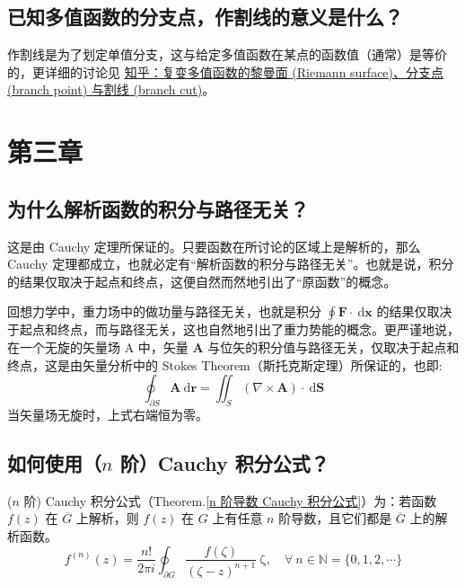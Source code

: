 \documentclass[UTF8]{report}
\def\N{\mathbb{N}}
\theoremstyle{MyLineTheoremStyle} %
\theoremstyle{MyBlockTheoremStyle} %
\theoremstyle{MySubsubsectionStyle} %
\begin{document}
\subsection{已知多值函数的分支点，作割线的意义是什么？}
作割线是为了划定单值分支，这与给定多值函数在某点的函数值（通常）是等价的，更详细的讨论见 \href{https://zhuanlan.zhihu.com/p/422338793}{知乎：复变多值函数的黎曼面 (Riemann surface)、分支点 (branch point) 与割线 (branch cut)}。

\section{第三章}

\subsection{为什么解析函数的积分与路径无关？}

这是由 Cauchy 定理所保证的。只要函数在所讨论的区域上是解析的，那么 Cauchy 定理都成立，也就必定有“解析函数的积分与路径无关”。也就是说，积分的结果仅取决于起点和终点，这便自然而然地引出了“原函数”的概念。

回想力学中，重力场中的做功量与路径无关，也就是积分 $\oint \boldsymbol{F}\cdot \ \mathrm{d}\boldsymbol{x}$ 的结果仅取决于起点和终点，而与路径无关，这也自然地引出了重力势能的概念。更严谨地说，在一个无旋的矢量场 A 中，矢量 $\boldsymbol{A}$ 与位矢的积分值与路径无关，仅取决于起点和终点，这是由矢量分析中的 Stokes Theorem（斯托克斯定理）所保证的，也即: 
\begin{equation}
\oint_{\partial S} \boldsymbol{A} \ \mathrm{d}\boldsymbol{r} = \iint_S (\nabla \times \boldsymbol{A}) \cdot \ \mathrm{d}\boldsymbol{S}
\end{equation}
当矢量场无旋时，上式右端恒为零。

\subsection{如何使用（$n$ 阶）Cauchy 积分公式？}

($n$ 阶) Cauchy 积分公式（Theorem.\ref{n 阶导数 Cauchy 积分公式}）为：若函数 $f(z)$ 在 $\overline{G}$ 上解析，则 $f(z)$ 在 $G$ 上有任意 $n$ 阶导数，且它们都是 $\overline{G}$ 上的解析函数。
\begin{equation}
f^{(n)}(z) = \frac{n !}{2\pi i} \oint_{\partial G} \frac{f(\zeta)}{(\zeta - z )^{n+1}} \ \mathrm{\zeta},\quad \forall\ n \in \N = \{0, 1, 2, \cdots\}
\end{equation}
\end{document}
